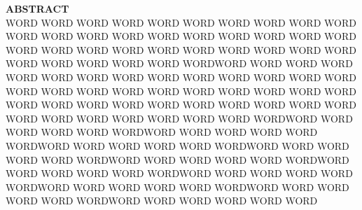 
\textbf{ABSTRACT} \\

WORD WORD WORD WORD WORD WORD WORD WORD WORD WORD WORD WORD WORD WORD WORD WORD WORD WORD WORD WORD WORD WORD WORD WORD WORD WORD WORD WORD WORD WORD WORD WORD WORD WORD WORD WORDWORD WORD WORD WORD WORD WORD WORD WORD WORD WORD WORD WORD WORD WORD WORD WORD WORD WORD WORD WORD WORD WORD WORD WORD WORD WORD WORD WORD WORD WORD WORD WORD WORD WORD WORD WORD WORD WORD WORD WORD WORD WORDWORD WORD WORD WORD WORD WORDWORD WORD WORD WORD WORD WORDWORD WORD WORD WORD WORD WORDWORD WORD WORD WORD WORD WORDWORD WORD WORD WORD WORD WORDWORD WORD WORD WORD WORD WORDWORD WORD WORD WORD WORD WORDWORD WORD WORD WORD WORD WORDWORD WORD WORD WORD WORD WORDWORD WORD WORD WORD WORD WORD